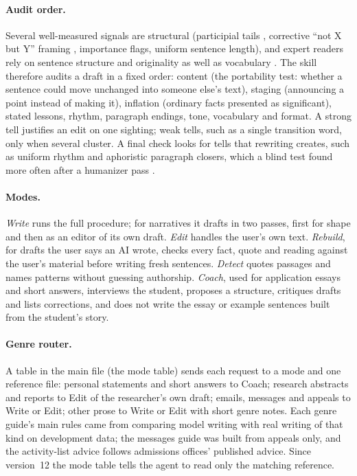 \documentclass[11pt]{article}
\begin{document}
\paragraph{Audit order.} Several well-measured signals are structural (participial tails \citep{reinhart2025llms}, corrective ``not X but Y'' framing \citep[measured in Mandarin by][]{peng2026notx}, importance flags, uniform sentence length), and expert readers rely on sentence structure and originality as well as vocabulary \citep{russell2025people,shaib2026slop}. The skill therefore audits a draft in a fixed order: content (the portability test: whether a sentence could move unchanged into someone else's text), staging (announcing a point instead of making it), inflation (ordinary facts presented as significant), stated lessons, rhythm, paragraph endings, tone, vocabulary and format. A strong tell justifies an edit on one sighting; weak tells, such as a single transition word, only when several cluster. A final check looks for tells that rewriting creates, such as uniform rhythm and aphoristic paragraph closers, which a blind test found more often after a humanizer pass \citep{lenk2026blind}.

\paragraph{Modes.} \emph{Write} runs the full procedure; for narratives it drafts in two passes, first for shape and then as an editor of its own draft. \emph{Edit} handles the user's own text. \emph{Rebuild}, for drafts the user says an AI wrote, checks every fact, quote and reading against the user's material before writing fresh sentences. \emph{Detect} quotes passages and names patterns without guessing authorship. \emph{Coach}, used for application essays and short answers, interviews the student, proposes a structure, critiques drafts and lists corrections, and does not write the essay or example sentences built from the student's story.

\paragraph{Genre router.} A table in the main file (the mode table) sends each request to a mode and one reference file: personal statements and short answers to Coach; research abstracts and reports to Edit of the researcher's own draft; emails, messages and appeals to Write or Edit; other prose to Write or Edit with short genre notes. Each genre guide's main rules came from comparing model writing with real writing of that kind on development data; the messages guide was built from appeals only, and the activity-list advice follows admissions offices' published advice. Since version~12 the mode table tells the agent to read only the matching reference.
\end{document}
